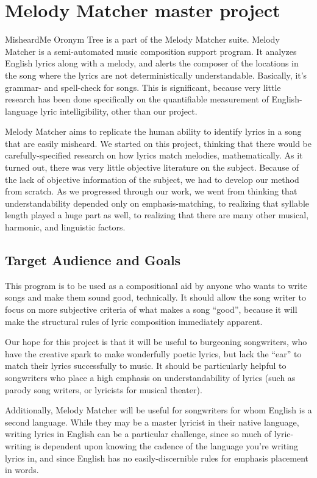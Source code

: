 \section{Melody Matcher master project}
\label{melodyMatcherMasterProject}
MisheardMe Oronym Tree is a part of the Melody Matcher suite. Melody Matcher is a semi-automated music composition support program. It analyzes English lyrics along with a melody, and alerts the composer of the locations in the song where the lyrics are not deterministically understandable. Basically, it's grammar- and spell-check for songs. This is significant, because very little research has been done specifically on the quantifiable measurement of English-language lyric intelligibility, other than our project.

\vspace{14pt}
Melody Matcher aims to replicate the human ability to identify lyrics in a song that are easily misheard. We started on this project, thinking that there would be carefully-specified research on how lyrics match melodies, mathematically. As it turned out, there was very little objective literature on the subject. Because of the lack of objective information of the subject, we had to develop our method from scratch. As we progressed through our work, we went from thinking that understandability depended only on emphasis-matching, to realizing that syllable length played a huge part as well, to realizing that there are many other musical, harmonic, and linguistic factors.
\vspace{14pt}

\subsection{Target Audience and Goals}
This program is to be used as a compositional aid by anyone who wants to write songs and make them sound good, technically. It should allow the song writer to focus on more subjective criteria of what makes a song ``good'', because it will make the structural rules of lyric composition immediately apparent.

Our hope for this project is that it will be useful to burgeoning songwriters, who have the creative spark to make wonderfully poetic lyrics, but lack the ``ear'' to match their lyrics successfully to music. It should be particularly helpful to songwriters who place a high emphasis on understandability of lyrics (such as parody song writers, or lyricists for musical theater).

Additionally, Melody Matcher will be useful for songwriters for whom English is a second language. While they may be a master lyricist in their native language, writing lyrics in English can be a particular challenge, since so much of lyric-writing is dependent upon knowing the cadence of the language you're writing lyrics in, and since English has no easily-discernible rules for emphasis placement in words.



